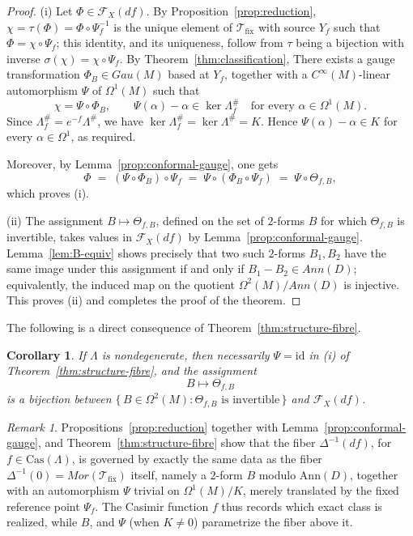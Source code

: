\documentclass[11pt,a4paper]{article}
\theoremstyle{plain}
\newtheorem{corollary}[theorem]{Corollary}
\theoremstyle{definition}
\theoremstyle{remark}
\newtheorem{remark}[theorem]{Remark}
\begin{document}
\begin{proof}
(i) Let $\Phi\in\mathcal F_X(df)$. By Proposition~\ref{prop:reduction}, $\chi=\tau(\Phi)=\Phi\circ\Psi_f^{-1}$
is the unique element of $\mathcal{T}_{\mathrm{fix}}$ with source $Y_f$ such that $\Phi=\chi\circ\Psi_f$; this
identity, and its uniqueness, follow from $\tau$ being a bijection with inverse
$\sigma(\chi)=\chi\circ\Psi_f$. By Theorem~\ref{thm:classification}, There exists  a gauge
transformation $\Phi_B\in Gau(M)$ based at $Y_f$, together with a $ C^{\infty}(M)$-linear automorphism $\Psi$ of
$\Omega^{1}(M)$  such that
$$
\chi = \Psi\circ\Phi_B, \qquad \Psi(\alpha)-\alpha \in \ker\Lambda_f^{\#} \quad \text{for every } \alpha\in\Omega^{1}(M).
$$
Since $\Lambda_f^{\#}=e^{-f}\Lambda^{\#}$, we have $\ker\Lambda_f^{\#}=
\ker\Lambda^{\#}=K$. Hence
$\Psi(\alpha)-\alpha\in K$ for every $\alpha\in\Omega^{1}$, as required.

Moreover, by Lemma~\ref{prop:conformal-gauge},  one gets
$$
\Phi \;=\; (\Psi\circ\Phi_B)\circ\Psi_f \;=\; \Psi\circ(\Phi_B\circ\Psi_f) \;=\; \Psi\circ\Theta_{f,B},
$$
which proves (i).

(ii) The assignment $B\mapsto\Theta_{f,B}$, defined on the set of $2$-forms $B$ for which
$\Theta_{f,B}$ is invertible, takes values in $\mathcal F_X(df)$ by Lemma~\ref{prop:conformal-gauge}.
Lemma~\ref{lem:B-equiv} shows precisely that two such $2$-forms $B_1,B_2$ have the same image under
this assignment if and only if $B_1-B_2\in Ann(D)$; equivalently, the induced map on the quotient
$\Omega^{2}(M)/ Ann(D)$ is injective. This proves (ii) and completes the proof of the theorem.
\end{proof}
The following is a direct consequence of Theorem~\ref{thm:structure-fibre}.

\begin{corollary}\label{cor:nondeg}
	If $\Lambda$ is nondegenerate, then necessarily $\Psi = \mathrm{id}$
	in (i) of Theorem~\ref{thm:structure-fibre}, and the assignment
	$$
	B \longmapsto \Theta_{f,B}
	$$
	is a bijection between $\{\, B \in \Omega^2(M) : \Theta_{f,B} \text{ is invertible} \,\}$ and $\mathcal{F}_X(df)$.
\end{corollary}

\begin{remark}\label{rem:fiber-remark}
	Propositions~\ref{prop:reduction} together with Lemma~\ref{prop:conformal-gauge}, and
	Theorem~\ref{thm:structure-fibre} show that the fiber $\Delta^{-1}(df)$, for $f \in \mathrm{Cas}(\Lambda)$, is governed
	by exactly the same data as the fiber $\Delta^{-1}(0) = Mor(\mathcal{T}_{\mathrm{fix}})$ itself, namely a $2$-form $B$
	modulo $\mathrm{Ann}(D)$, together with an automorphism $\Psi$ trivial on $\Omega^1(M)/K$, merely translated by
	the fixed reference point $\Psi_f$. The Casimir function $f$ thus records which exact class
	is realized, while $B$, and $\Psi$ (when $K \neq 0$) parametrize the fiber above it.
\end{remark}
\end{document}
